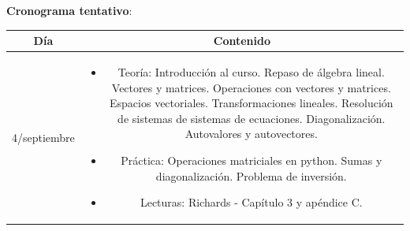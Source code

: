 \documentclass[11pt]{article}
\begin{document}
\newpage
\textbf {\large Cronograma tentativo}:

\begin{longtable}[h!]{| c | c | }
\toprule
\textbf{Día} & \textbf{Contenido} \\

\midrule
4/septiembre & \begin{minipage}{.65\textwidth}
\begin{itemize} 
    \vspace{1mm}
\item Teoría: Introducción al curso. Repaso de álgebra lineal. Vectores y matrices. Operaciones con vectores y matrices. Espacios vectoriales. Transformaciones lineales. Resolución de sistemas de sistemas de ecuaciones. Diagonalización. Autovalores y autovectores.
	  \item Práctica: Operaciones matriciales en python. Sumas y diagonalización. Problema de inversión. 
	\item Lecturas: Richards - Capítulo 3 y apéndice C. 
    \vspace{1mm}
\end{itemize}
\end{minipage} \\


\end{longtable}
\end{document}
